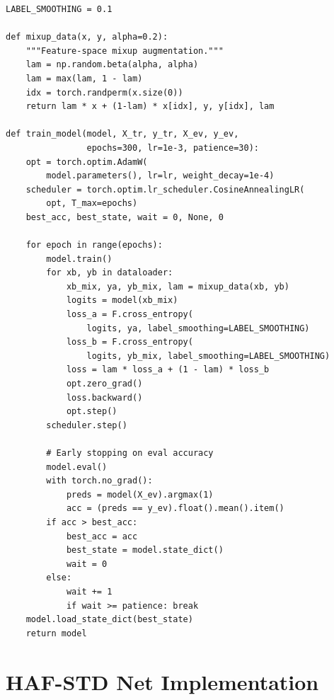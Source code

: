 \begin{lstlisting}[caption={Training loop with label smoothing, mixup augmentation, and cosine LR scheduling.}, label={lst:training_loop}]
LABEL_SMOOTHING = 0.1

def mixup_data(x, y, alpha=0.2):
    """Feature-space mixup augmentation."""
    lam = np.random.beta(alpha, alpha)
    lam = max(lam, 1 - lam)
    idx = torch.randperm(x.size(0))
    return lam * x + (1-lam) * x[idx], y, y[idx], lam

def train_model(model, X_tr, y_tr, X_ev, y_ev,
                epochs=300, lr=1e-3, patience=30):
    opt = torch.optim.AdamW(
        model.parameters(), lr=lr, weight_decay=1e-4)
    scheduler = torch.optim.lr_scheduler.CosineAnnealingLR(
        opt, T_max=epochs)
    best_acc, best_state, wait = 0, None, 0

    for epoch in range(epochs):
        model.train()
        for xb, yb in dataloader:
            xb_mix, ya, yb_mix, lam = mixup_data(xb, yb)
            logits = model(xb_mix)
            loss_a = F.cross_entropy(
                logits, ya, label_smoothing=LABEL_SMOOTHING)
            loss_b = F.cross_entropy(
                logits, yb_mix, label_smoothing=LABEL_SMOOTHING)
            loss = lam * loss_a + (1 - lam) * loss_b
            opt.zero_grad()
            loss.backward()
            opt.step()
        scheduler.step()

        # Early stopping on eval accuracy
        model.eval()
        with torch.no_grad():
            preds = model(X_ev).argmax(1)
            acc = (preds == y_ev).float().mean().item()
        if acc > best_acc:
            best_acc = acc
            best_state = model.state_dict()
            wait = 0
        else:
            wait += 1
            if wait >= patience: break
    model.load_state_dict(best_state)
    return model
\end{lstlisting}

\section{HAF-STD Net Implementation}

